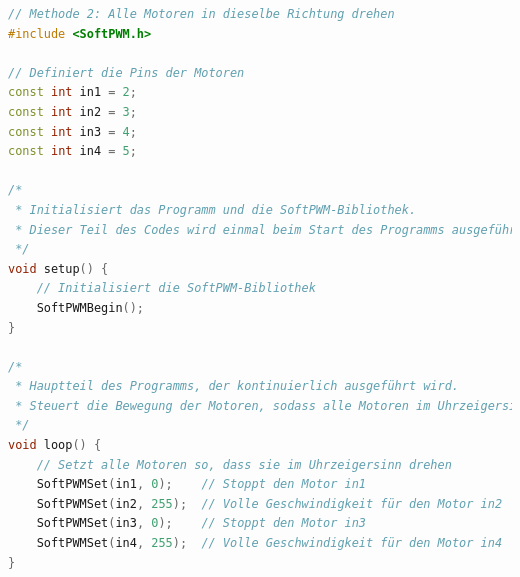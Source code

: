 \documentclass{vorlage-design-main}
\begin{document}
\begin{lstlisting}[language={C++}]
// Methode 2: Alle Motoren in dieselbe Richtung drehen
#include <SoftPWM.h>

// Definiert die Pins der Motoren
const int in1 = 2;
const int in2 = 3;
const int in3 = 4;
const int in4 = 5;

/*
 * Initialisiert das Programm und die SoftPWM-Bibliothek.
 * Dieser Teil des Codes wird einmal beim Start des Programms ausgeführt.
 */
void setup() {
    // Initialisiert die SoftPWM-Bibliothek
    SoftPWMBegin();
}

/*
 * Hauptteil des Programms, der kontinuierlich ausgeführt wird.
 * Steuert die Bewegung der Motoren, sodass alle Motoren im Uhrzeigersinn drehen.
 */
void loop() {
    // Setzt alle Motoren so, dass sie im Uhrzeigersinn drehen
    SoftPWMSet(in1, 0);    // Stoppt den Motor in1
    SoftPWMSet(in2, 255);  // Volle Geschwindigkeit für den Motor in2
    SoftPWMSet(in3, 0);    // Stoppt den Motor in3
    SoftPWMSet(in4, 255);  // Volle Geschwindigkeit für den Motor in4
}
\end{lstlisting}
\end{document}
